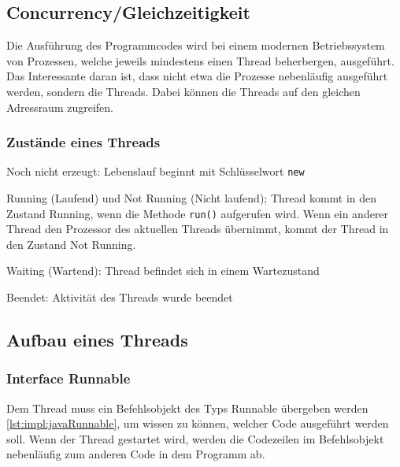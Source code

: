  
\subsection{Concurrency/Gleichzeitigkeit}
Die Ausführung des Programmcodes wird bei einem modernen Betriebssystem von Prozessen, welche jeweils mindestens einen Thread beherbergen, ausgeführt. Das Interessante daran ist, dass nicht etwa die Prozesse nebenläufig ausgeführt werden, sondern die Threads. Dabei können die Threads auf den gleichen Adressraum zugreifen. \cite{javaInselBuch}
 
\subsubsection{Zustände eines Threads}
\begin{compactitem}
    \item Noch nicht erzeugt: Lebenslauf beginnt mit Schlüsselwort \texttt{new}
    \item Running (Laufend) und Not Running (Nicht laufend); Thread kommt in den Zustand Running, wenn die Methode \texttt{run()} aufgerufen wird. Wenn ein anderer Thread den Prozessor des aktuellen Threads übernimmt, kommt der Thread in den Zustand Not Running.    
    \item Waiting (Wartend): Thread befindet sich in einem Wartezustand
    \item Beendet: Aktivität des Threads wurde beendet
\end{compactitem}
\cite{javaInselBuch} 

\subsection{Aufbau eines Threads}
\subsubsection{Interface Runnable}
Dem Thread muss ein Befehlsobjekt des Typs Runnable übergeben werden \ref{lst:impl:javaRunnable}, um wissen zu können, welcher Code ausgeführt werden soll.
Wenn der Thread gestartet wird, werden die Codezeilen im Befehlsobjekt nebenläufig zum anderen Code in dem Programm ab. \cite{javaInselBuch}
 
